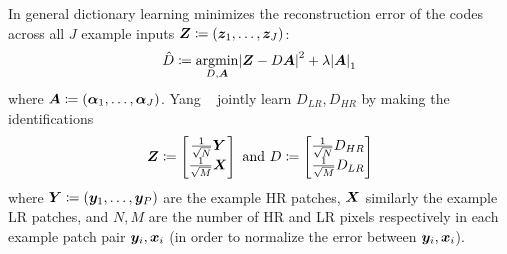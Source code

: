 %
In general dictionary learning minimizes the reconstruction error of the codes across all \(J\) example inputs \(\bm{Z} \coloneqq \left( \bm{z}_1, \mathellipsis, \bm{z}_J \right)\):
\begin{equation}
    \hat{D} \coloneqq \underset{D, \bm{A}}{\text{argmin}} \abs{ \bm{Z} - D\bm{A} }^2 + \lambda \abs{ \bm{A} }_1
\end{equation}
where \(\bm{A} \coloneqq \left( \bm{\alpha}_1, \mathellipsis, \bm{\alpha}_J  \right)\).
%
Yang \etal~ jointly learn \(D_{LR}, D_{HR}\) by making the identifications
\begin{equation*}
    \bm{Z} \coloneqq \begin{bmatrix}
                         \frac{1}{\sqrt{N}}\bm{Y} \\ \frac{1}{\sqrt{M}} \bm{X}
    \end{bmatrix} \text{ and }
    D \coloneqq \begin{bmatrix}
                    \frac{1}{\sqrt{N}} D_{HR} \\ \frac{1}{\sqrt{M}} D_{LR}
    \end{bmatrix}
\end{equation*}
where \(\bm{Y} \coloneqq \left( \bm{y}_1, \mathellipsis, \bm{y}_P \right)\) are the example HR patches, \(\bm{X}\) similarly the example LR patches, and \(N, M\) are the number of HR and LR pixels respectively in each example patch pair \(\bm{y}_i, \bm{x}_i\) (in order to normalize the error between \(\bm{y}_i, \bm{x}_i\)).
